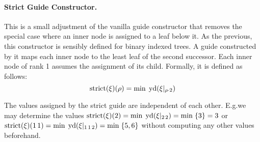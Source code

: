 \documentclass[../../document.tex]{subfiles}
\begin{document}
    \paragraph{Strict Guide Constructor.}
    This is a small adjustment of the vanilla guide constructor that removes the special case where an inner node is assigned to a leaf below it.
    As the previous, this constructor is sensibly defined for binary indexed trees.
    A guide constructed by it maps each inner node to the least leaf of the second successor.
    Each inner node of rank 1 assumes the assignment of its child.
    Formally, it is defined as follows:
    \[
        \mathrm{strict}(\xi)(\rho) = \min \; \operatorname{yd}(\xi|_{\rho\cdot 2})
    \]

    The values assigned by the strict guide are independent of each other.
    E.g.\@ we may determine the values \(\mathrm{strict}(\xi)(2) = \min\;\operatorname{yd}(\xi|_{2\,2}) = \min\;\{3\} = 3\) or \(\mathrm{strict}(\xi)(1\,1) = \min\;\operatorname{yd}(\xi|_{1\,1\,2}) = \min\;\{5,6\}\) without computing any other values beforehand.
\end{document}
